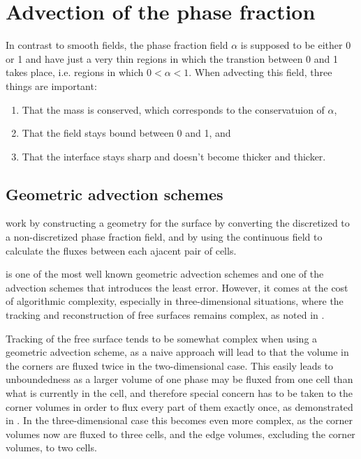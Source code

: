 \section{Advection of the phase fraction}

In contrast to smooth fields, the phase fraction field $\alpha$ is supposed to be either 0 or 1 and have just a very thin regions in which the transtion between 0 and 1 takes place, i.e. regions in which $0 < \alpha < 1$. When advecting this field, three things are important:

\begin{enumerate}
\item That the mass is conserved, which corresponds to the conservatuion of $\alpha$,
\item That the field stays bound between 0 and 1, and
\item That the interface stays sharp and doesn't become thicker and thicker.
\end{enumerate}

\subsection{Geometric advection schemes}

 work by constructing a geometry for the surface by converting the discretized  to a non-discretized phase fraction field, and by using the continuous field to calculate the fluxes between each ajacent pair of cells.

\PLIC is one of the most well known geometric advection schemes and one of the advection schemes that introduces the least error. However, it comes at the cost of algorithmic complexity, especially in three-dimensional situations, where the tracking and reconstruction of free surfaces remains complex, as noted in \citep{Ingram2009}.

Tracking of the free surface tends to be somewhat complex when using a geometric advection scheme, as a naive approach will lead to that the volume in the corners are fluxed twice in the two-dimensional case. This easily leads to unboundedness as a larger volume of one phase may be fluxed from one cell than what is currently in the cell, and therefore special concern has to be taken to the corner volumes in order to flux every part of them exactly once, as demonstrated in \citep{Rider1998}. In the three-dimensional case this becomes even more complex, as the corner volumes now are fluxed to three cells, and the edge volumes, excluding the corner volumes, to two cells.

